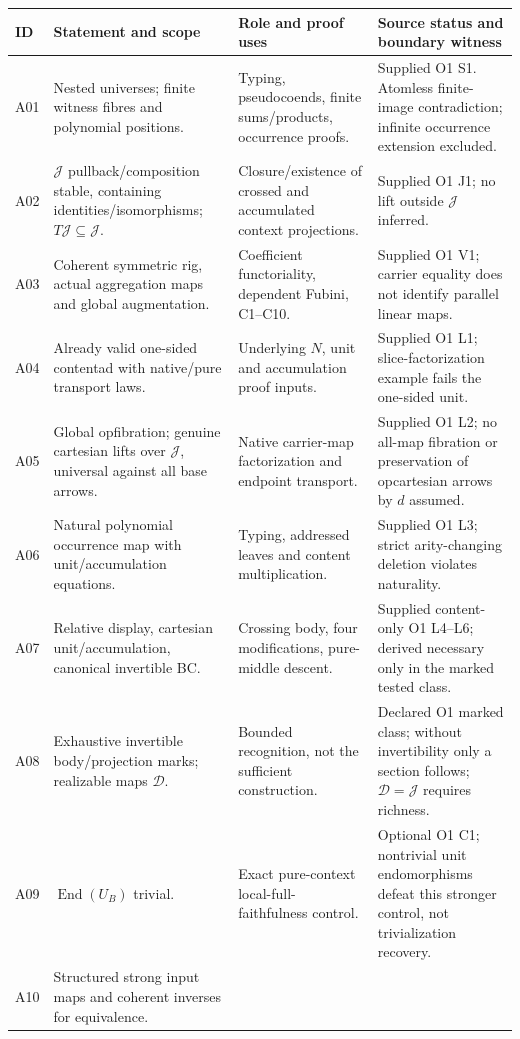 \documentclass[11pt,a4paper]{article}
\theoremstyle{definition}
\newcommand{\J}{\mathcal J}
\begin{document}
\small
\begin{longtable}{@{}p{.08\linewidth}p{.30\linewidth}p{.28\linewidth}p{.25\linewidth}@{}}
\toprule ID&Statement and scope&Role and proof uses&Source status and boundary witness\\\midrule\endhead
A01&Nested universes; finite witness fibres and polynomial positions.&Typing,
pseudocoends, finite sums/products, occurrence proofs.&Supplied O1 S1.
Atomless finite-image contradiction; infinite occurrence extension excluded.\\
A02&\(\J\) pullback/composition stable, containing identities/isomorphisms;
\(T\J\subseteq\J\).&Closure/existence of crossed and accumulated context
projections.&Supplied O1 J1; no lift outside \(\J\) inferred.\\
A03&Coherent symmetric rig, actual aggregation maps and global augmentation.&
Coefficient functoriality, dependent Fubini, C1--C10.&Supplied O1 V1;
carrier equality does not identify parallel linear maps.\\
A04&Already valid one-sided contentad with native/pure transport laws.&
Underlying \(N\), unit and accumulation proof inputs.&Supplied O1 L1;
slice-factorization example fails the one-sided unit.\\
A05&Global opfibration; genuine cartesian lifts over \(\J\), universal
against all base arrows.&Native carrier-map factorization and endpoint
transport.&Supplied O1 L2; no all-map fibration or preservation of opcartesian
arrows by \(d\) assumed.\\
A06&Natural polynomial occurrence map with unit/accumulation equations.&
Typing, addressed leaves and content multiplication.&Supplied O1 L3;
strict arity-changing deletion violates naturality.\\
A07&Relative display, cartesian unit/accumulation, canonical invertible BC.&
Crossing body, four modifications, pure-middle descent.&Supplied content-only
O1 L4--L6; derived necessary only in the marked tested class.\\
A08&Exhaustive invertible body/projection marks; realizable maps \(\mathcal D\).&
Bounded recognition, not the sufficient construction.&Declared O1 marked
class; without invertibility only a section follows; \(\mathcal D=\J\)
requires richness.\\
A09&\(\operatorname{End}(U_B)\) trivial.&Exact pure-context local-full-
faithfulness control.&Optional O1 C1; nontrivial unit endomorphisms defeat
this stronger control, not trivialization recovery.\\
A10&Structured strong input maps and coherent inverses for equivalence.&

\end{longtable}
\end{document}
